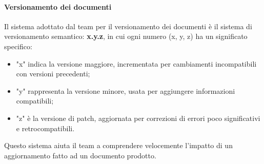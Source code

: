 \documentclass[10pt]{article}
\begin{document}
\begin{justify}
        \paragraph{Versionamento dei documenti}
        Il sistema adottato dal team per il versionamento dei documenti è il sistema di versionamento semantico: \textbf{x.y.z}, in cui ogni numero (x, y, z) ha un significato specifico:\\
        \begin{itemize}
            \item "x" indica la versione maggiore, incrementata per cambiamenti incompatibili con versioni precedenti;
            \item "y" rappresenta la versione minore, usata per aggiungere informazioni compatibili;
            \item "z" è la versione di patch, aggiornata per correzioni di errori poco significativi e retrocompatibili.
        \end{itemize}
        Questo sistema aiuta il team a comprendere velocemente l'impatto di un aggiornamento fatto ad un documento prodotto.\\


\end{justify}
\end{document}

